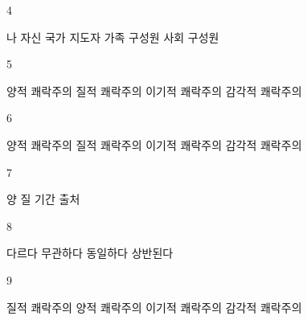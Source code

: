 \documentclass[fs9,seriesRus]{korfarm-base}
\begin{document}
\begin{kfSentenceUnit}{4}{}
\begin{kfChoices}
\kfChoice 나 자신
\kfChoice 국가 지도자
\kfChoice 가족 구성원
\kfChoice 사회 구성원
\end{kfChoices}
\end{kfSentenceUnit}

\begin{kfSentenceUnit}{5}{}
\begin{kfChoices}
\kfChoice 양적 쾌락주의
\kfChoice 질적 쾌락주의
\kfChoice 이기적 쾌락주의
\kfChoice 감각적 쾌락주의
\end{kfChoices}
\end{kfSentenceUnit}

\begin{kfSentenceUnit}{6}{}
\begin{kfChoices}
\kfChoice 양적 쾌락주의
\kfChoice 질적 쾌락주의
\kfChoice 이기적 쾌락주의
\kfChoice 감각적 쾌락주의
\end{kfChoices}
\end{kfSentenceUnit}

\begin{kfSentenceUnit}{7}{}
\begin{kfChoices}
\kfChoice 양
\kfChoice 질
\kfChoice 기간
\kfChoice 출처
\end{kfChoices}
\end{kfSentenceUnit}

\begin{kfSentenceUnit}{8}{}
\begin{kfChoices}
\kfChoice 다르다
\kfChoice 무관하다
\kfChoice 동일하다
\kfChoice 상반된다
\end{kfChoices}
\end{kfSentenceUnit}

\begin{kfSentenceUnit}{9}{}
\begin{kfChoices}
\kfChoice 질적 쾌락주의
\kfChoice 양적 쾌락주의
\kfChoice 이기적 쾌락주의
\kfChoice 감각적 쾌락주의
\end{kfChoices}
\end{kfSentenceUnit}
\end{document}
